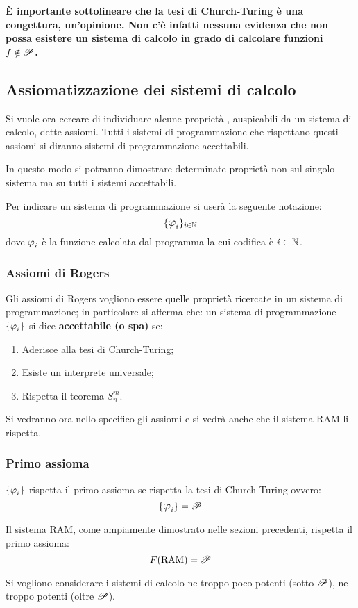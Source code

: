 \textbf{È importante sottolineare che la tesi di Church-Turing è una congettura, 
un'opinione. Non c'è infatti nessuna evidenza che non possa esistere un sistema di 
calcolo in grado di calcolare funzioni $f\notin\mathscr{P}$.}

\subsection{Assiomatizzazione dei sistemi di calcolo}
Si vuole ora cercare di individuare alcune proprietà , auspicabili da 
un sistema di calcolo, dette assiomi. Tutti i sistemi di programmazione che rispettano
questi assiomi si diranno sistemi di programmazione accettabili.

In questo modo si potranno dimostrare determinate proprietà non sul singolo sistema
ma su tutti i sistemi accettabili.

Per indicare un sistema di programmazione si userà la seguente notazione:
$$ \sistProg_{i\in\N} $$
dove $\semRAM_i$ è la funzione calcolata dal programma la cui codifica è 
$i\in\mathbb{N}$.

\subsubsection{Assiomi di Rogers}
Gli assiomi di Rogers vogliono essere quelle  proprietà ricercate in
un sistema di programmazione; in particolare si afferma che: un sistema di
programmazione $\sistProg$ si dice \textbf{accettabile (o spa)} se: 
\begin{enumerate}
    \item Aderisce alla tesi di Church-Turing;
    \item Esiste un interprete universale;
    \item Rispetta il teorema $S_n^m$.
\end{enumerate}

Si vedranno ora nello specifico gli assiomi e si vedrà anche che il sistema RAM
li rispetta.

\subsubsection*{Primo assioma}
$\sistProg$ rispetta il primo assioma se rispetta la tesi di Church-Turing
ovvero:
$$ \sistProg =\ricPar $$

Il sistema RAM, come ampiamente dimostrato nelle sezioni precedenti, rispetta
il primo assioma:
$$ F(\text{RAM})=\mathscr{P} $$

Si vogliono considerare i sistemi di calcolo ne troppo poco potenti (sotto $\mathscr{P}$),
ne troppo potenti (oltre $\mathscr{P}$).

